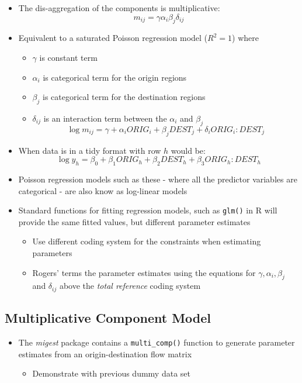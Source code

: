 \documentclass[
]{book}
\providecommand{\tightlist}{%
  \setlength{\itemsep}{0pt}\setlength{\parskip}{0pt}}
\begin{document}
\begin{itemize}
\tightlist
\item
  The dis-aggregation of the components is multiplicative:
  \[
  m_{ij} = \gamma \alpha_i \beta_j \delta_{ij}
  \]
\item
  Equivalent to a saturated Poisson regression model (\(R^2 = 1\)) where

  \begin{itemize}
  \tightlist
  \item
    \(\gamma\) is constant term
  \item
    \(\alpha_i\) is categorical term for the origin regions
  \item
    \(\beta_j\) is categorical term for the destination regions
  \item
    \(\delta_{ij}\) is an interaction term between the \(\alpha_i\) and \(\beta_j\)
    \[
    \log m_{ij} = \gamma +  \alpha_i ORIG_i + \beta_j DEST_j +  \delta_i ORIG_i:DEST_j
    \]
  \end{itemize}
\item
  When data is in a tidy format with row \(h\) would be:
  \[
  \log y_{h} =  \beta_0 +  \beta_1 ORIG_{h} + \beta_2 DEST_{h} + \beta_3 ORIG_{h}:DEST_{h}
  \]
\item
  Poisson regression models such as these - where all the predictor variables are categorical - are also know as log-linear models
\item
  Standard functions for fitting regression models, such as \texttt{glm()} in R will provide the same fitted values, but different parameter estimates

  \begin{itemize}
  \tightlist
  \item
    Use different coding system for the constraints when estimating parameters
  \item
    Rogers' terms the parameter estimates using the equations for \(\gamma, \alpha_i, \beta_j\) and \(\delta_{ij}\) above the \emph{total reference} coding system
  \end{itemize}
\end{itemize}

\hypertarget{multiplicative-component-model-2}{%
\subsection{Multiplicative Component Model}\label{multiplicative-component-model-2}}

\begin{itemize}
\tightlist
\item
  The \emph{migest} package contains a \texttt{multi\_comp()} function to generate parameter estimates from an origin-destination flow matrix

  \begin{itemize}
  \tightlist
  \item
    Demonstrate with previous dummy data set
  \end{itemize}
\end{itemize}
\end{document}

